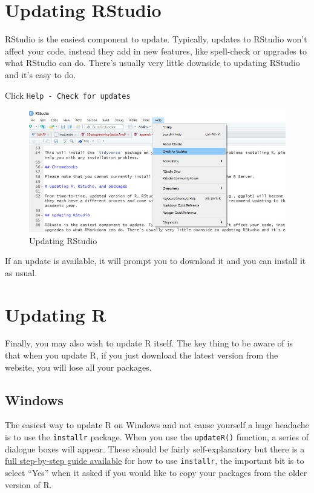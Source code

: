 \documentclass[
  oneside]{book}
\begin{document}
\hypertarget{updating-rstudio}{%
\section{Updating RStudio}\label{updating-rstudio}}

RStudio is the easiest component to update. Typically, updates to RStudio won't affect your code, instead they add in new features, like spell-check or upgrades to what RStudio can do. There's usually very little downside to updating RStudio and it's easy to do.

Click \texttt{Help\ -\ Check\ for\ updates}

\begin{figure}

{\centering \includegraphics[width=1\linewidth]{images/update_rstudio} 

}

\caption{Updating RStudio}\label{fig:img-updaterstudio}
\end{figure}

If an update is available, it will prompt you to download it and you can install it as usual.

\hypertarget{updating-r}{%
\section{Updating R}\label{updating-r}}

Finally, you may also wish to update R itself. The key thing to be aware of is that when you update R, if you just download the latest version from the website, you will lose all your packages.

\hypertarget{windows}{%
\subsection{Windows}\label{windows}}

The easiest way to update R on Windows and not cause yourself a huge headache is to use the \texttt{installr} package. When you use the \texttt{updateR()} function, a series of dialogue boxes will appear. These should be fairly self-explanatory but there is a \href{https://www.r-statistics.com/2015/06/a-step-by-step-screenshots-tutorial-for-upgrading-r-on-windows/}{full step-by-step guide available} for how to use \texttt{installr}, the important bit is to select ``Yes'' when it asked if you would like to copy your packages from the older version of R.
\end{document}
